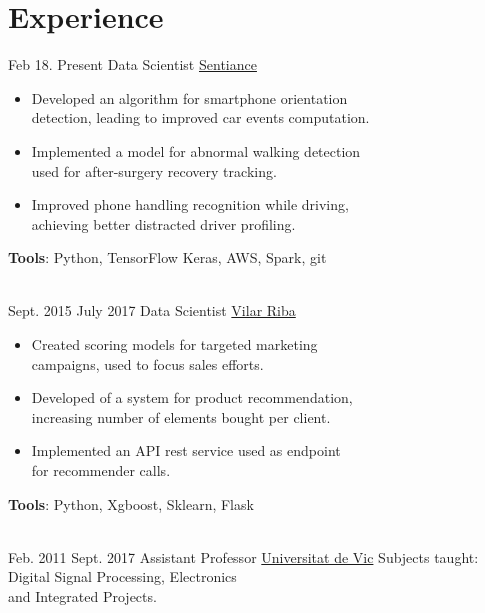 \documentclass[letterpaper]{DS_class_file} %
\begin{document}
    \makeprofile %



    \section{Experience}

    \begin{twenty}
        \twentyitem
        {Feb 18.}
        {Present}
        {Data Scientist}
        {\href{https://www.sentiance.com/}{Sentiance}}
        {}
        {\begin{itemize}
             \item Developed an algorithm for smartphone orientation\\detection, leading to improved car events computation.
             \item Implemented a model for abnormal walking detection\\used for after-surgery recovery tracking.
             \item Improved phone handling recognition while driving,\\achieving better distracted driver profiling.
        \end{itemize}
        \textbf{Tools}: Python, TensorFlow Keras, AWS, Spark, git}
        \\
        \twentyitem
        {Sept. 2015}
        {July 2017}
        {Data Scientist}
        {\href{http://www.vilarriba.com/}{Vilar Riba}}
        {}
        {\begin{itemize}
             \item Created scoring models for targeted marketing  \\ campaigns, used to focus sales efforts.
             \item Developed of a system for product recommendation, \\ increasing number of elements bought per client.
             \item Implemented an API rest service used as endpoint \\ for recommender calls.
        \end{itemize}
        \textbf{Tools}: Python, Xgboost, Sklearn, Flask }
        \\
        \twentyitem
        {Feb. 2011}
        {Sept. 2017}
        {Assistant Professor}
        {\href{https://www.uvic.cat/}{Universitat de Vic}}
        {Subjects taught: Digital Signal Processing, Electronics \\ and Integrated Projects.}
        {}
    \end{twenty}
\end{document}
